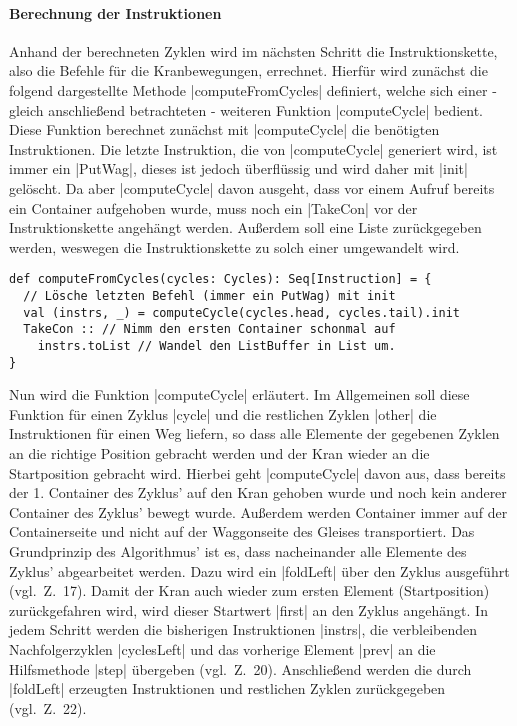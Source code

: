 \paragraph{Berechnung der Instruktionen}
Anhand der berechneten Zyklen wird im nächsten Schritt die Instruktionskette, also die Befehle für die Kranbewegungen, errechnet.
Hierfür wird zunächst die folgend dargestellte Methode |computeFromCycles| definiert,
welche sich einer - gleich anschließend betrachteten - weiteren Funktion |computeCycle| bedient.
Diese Funktion berechnet zunächst mit |computeCycle| die benötigten Instruktionen.
Die letzte Instruktion, die von |computeCycle| generiert wird, ist immer ein |PutWag|, dieses ist jedoch überflüssig und wird daher mit |init| gelöscht.
Da aber |computeCycle| davon ausgeht, dass vor einem Aufruf bereits ein Container aufgehoben wurde,
 muss noch ein |TakeCon| vor der Instruktionskette angehängt werden.
Außerdem soll eine Liste zurückgegeben werden, weswegen die Instruktionskette zu solch einer umgewandelt wird.
\lstset{basicstyle=\ttfamily}
\begin{lstlisting}
def computeFromCycles(cycles: Cycles): Seq[Instruction] = {
  // Lösche letzten Befehl (immer ein PutWag) mit init
  val (instrs, _) = computeCycle(cycles.head, cycles.tail).init
  TakeCon :: // Nimm den ersten Container schonmal auf
    instrs.toList // Wandel den ListBuffer in List um.
}
\end{lstlisting}
\lstset{basicstyle=\ttfamily}
Nun wird die Funktion |computeCycle| erläutert.
Im Allgemeinen soll diese Funktion für einen Zyklus |cycle| und die restlichen Zyklen |other| die Instruktionen für einen Weg liefern,
so dass alle Elemente der gegebenen Zyklen an die richtige Position gebracht werden und der Kran wieder an die Startposition gebracht wird.
Hierbei geht |computeCycle| davon aus, dass bereits der 1. Container des Zyklus' auf den Kran gehoben wurde und noch kein anderer Container des Zyklus' bewegt wurde.
Außerdem werden Container immer auf der Containerseite und nicht auf der Waggonseite des Gleises transportiert.
Das Grundprinzip des Algorithmus' ist es, dass nacheinander alle Elemente des Zyklus' abgearbeitet werden.
Dazu wird ein |foldLeft| über den Zyklus ausgeführt (vgl.\ Z.\ 17).
Damit der Kran auch wieder zum ersten Element (Startposition) zurückgefahren wird, wird dieser Startwert |first| an den Zyklus angehängt.
In jedem Schritt werden die bisherigen Instruktionen |instrs|, die verbleibenden Nachfolgerzyklen |cyclesLeft| und das vorherige Element |prev|
an die Hilfsmethode |step| übergeben (vgl.\ Z.\ 20).
Anschließend werden die durch |foldLeft| erzeugten Instruktionen und restlichen Zyklen zurück\-ge\-ge\-ben (vgl.\ Z.\ 22).

